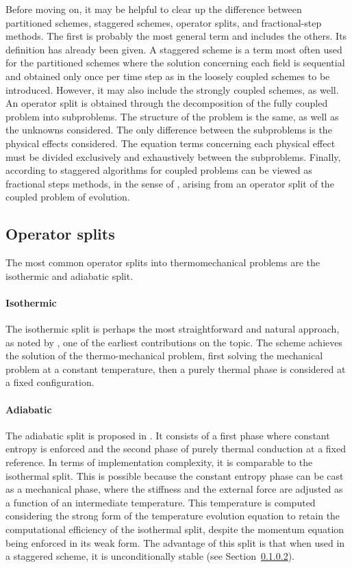 Before moving on, it may be helpful to clear up the difference between partitioned schemes, staggered schemes, operator splits, and fractional-step methods.
The first is probably the most general term and includes the others.
Its definition has already been given.
A staggered scheme is a term most often used for the partitioned schemes where the solution concerning each field is sequential and obtained only once per time step as in the loosely coupled schemes to be introduced.
However, it may also include the strongly coupled schemes, as well.
An operator split is obtained through the decomposition of the fully coupled problem into subproblems.
The structure of the problem is the same, as well as the unknowns considered.
The only difference between the subproblems is the physical effects considered.
The equation terms concerning each physical effect must be divided exclusively and exhaustively between the subproblems.
Finally, according to \cite{armero_new_1992} staggered algorithms for coupled problems can be viewed as fractional steps methods, in the sense of \cite{holt_method_2012}, arising from an operator split of the coupled problem of evolution.

\subsection{Operator splits}

The most common operator splits into thermomechanical problems are the isothermic and adiabatic split.

\paragraph{Isothermic}

The isothermic split is perhaps the most straightforward and natural approach, as noted by \cite{argyris_natural_1981}, one of the earliest contributions on the topic.
The scheme achieves the solution of the thermo-mechanical problem, first solving the mechanical problem at a constant temperature, then a purely thermal phase is considered at a fixed configuration.

\paragraph{Adiabatic}

The adiabatic split is proposed in \cite{armero_new_1992}.
It consists of a first phase where constant entropy is enforced and the second phase of purely thermal conduction at a fixed reference.
In terms of implementation complexity, it is comparable to the isothermal split.
This is possible because the constant entropy phase can be cast as a mechanical phase, where the stiffness and the external force are adjusted as a function of an intermediate temperature.
This temperature is computed considering the strong form of the temperature evolution equation to retain the computational efficiency of the isothermal split, despite the momentum equation being enforced in its weak form.
The advantage of this split is that when used in a staggered scheme, it is unconditionally stable (see Section~\ref{}).


